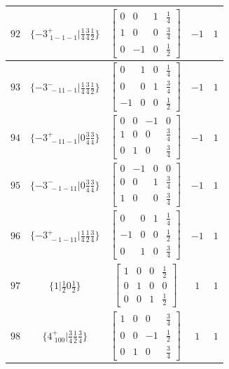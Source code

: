 \documentclass[fleqn,8pt]{jsarticle}
\begin{document}
\begin{longtable}{ccccc}
$ 92 $ & $ \{-3^{+}_{\,\,1-1-1}|\frac{1}{4} \frac{3}{4} \frac{1}{2}\} $ & $ \begin{bmatrix} 0 & 0 & 1 & \frac{1}{4} \\ 1 & 0 & 0 & \frac{3}{4} \\ 0 & -1 & 0 & \frac{1}{2} \end{bmatrix} $ & $ -1 $ & $ 1 $ \\ \hline
$ 93 $ & $ \{-3^{-}_{\,\,-11-1}|\frac{1}{4} \frac{3}{4} \frac{1}{2}\} $ & $ \begin{bmatrix} 0 & 1 & 0 & \frac{1}{4} \\ 0 & 0 & 1 & \frac{3}{4} \\ -1 & 0 & 0 & \frac{1}{2} \end{bmatrix} $ & $ -1 $ & $ 1 $ \\ \hline
$ 94 $ & $ \{-3^{+}_{\,\,-11-1}|0 \frac{3}{4} \frac{3}{4}\} $ & $ \begin{bmatrix} 0 & 0 & -1 & 0 \\ 1 & 0 & 0 & \frac{3}{4} \\ 0 & 1 & 0 & \frac{3}{4} \end{bmatrix} $ & $ -1 $ & $ 1 $ \\ \hline
$ 95 $ & $ \{-3^{-}_{\,\,-1-11}|0 \frac{3}{4} \frac{3}{4}\} $ & $ \begin{bmatrix} 0 & -1 & 0 & 0 \\ 0 & 0 & 1 & \frac{3}{4} \\ 1 & 0 & 0 & \frac{3}{4} \end{bmatrix} $ & $ -1 $ & $ 1 $ \\ \hline
$ 96 $ & $ \{-3^{+}_{\,\,-1-11}|\frac{1}{4} \frac{1}{2} \frac{3}{4}\} $ & $ \begin{bmatrix} 0 & 0 & 1 & \frac{1}{4} \\ -1 & 0 & 0 & \frac{1}{2} \\ 0 & 1 & 0 & \frac{3}{4} \end{bmatrix} $ & $ -1 $ & $ 1 $ \\ \hline
$ 97 $ & $ \{1|\frac{1}{2} 0 \frac{1}{2}\} $ & $ \begin{bmatrix} 1 & 0 & 0 & \frac{1}{2} \\ 0 & 1 & 0 & 0 \\ 0 & 0 & 1 & \frac{1}{2} \end{bmatrix} $ & $ 1 $ & $ 1 $ \\ \hline
$ 98 $ & $ \{4^{+}_{\,\,100}|\frac{3}{4} \frac{1}{2} \frac{3}{4}\} $ & $ \begin{bmatrix} 1 & 0 & 0 & \frac{3}{4} \\ 0 & 0 & -1 & \frac{1}{2} \\ 0 & 1 & 0 & \frac{3}{4} \end{bmatrix} $ & $ 1 $ & $ 1 $ \\ \hline

\end{longtable}
\end{document}
